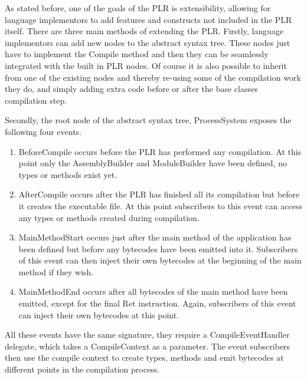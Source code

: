 	As stated before, one of the goals of the PLR is extensibility, allowing
	for language implementors to add features and constructs not included in
	the PLR itself. There are three main methods of extending the PLR. Firstly,
	language implementors can add new nodes to the abstract syntax tree. These
	nodes just have to implement the \textsf{Compile} method and then they can
	be seamlessly integrated with the built in PLR nodes. Of course it is also
	possible to inherit from one of the existing nodes and thereby re-using some
	of the compilation work they do, and simply adding extra code before or after
	the base classes compilation step. 
	
	Secondly, the root node of the abstract	syntax tree, \textsf{ProcessSystem} 
	exposes the following four events. 
	
	\begin{enumerate}
		\item \textsf{BeforeCompile} occurs before the PLR has performed any 
		compilation. At this point only the \textsf{AssemblyBuilder} and 
		\textsf{ModuleBuilder} have been defined, no types or methods exist yet.
		
		\item \textsf{AfterCompile} occurs after the PLR has finished all its
		compilation but before it creates the executable file. At this point
		subscribers to this event can access any types or methods created during
		compilation.
		
		\item \textsf{MainMethodStart} occurs just after the main method of the
		application has been defined but before any bytecodes have been emitted
		into it. Subscribers of this event can then inject their own bytecodes at the
		beginning of the main method if they wish.
		
		\item \textsf{MainMethodEnd} occurs after all bytecodes of the main method
		have been emitted, except for the final \textsf{Ret} instruction. Again, 
		subscribers of this event can inject their own bytecodes at this point.
	\end{enumerate}
	
	All these events have the same signature, they require a \textsf{CompileEventHandler}
	delegate, which takes a \textsf{CompileContext} as a parameter. The event
	subscribers then use the compile context to create types, methods and emit
	bytecodes at different points in the compilation process.
	
